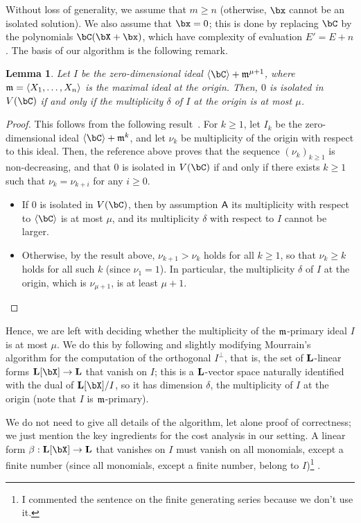 \documentclass[12pt]{article}
\newtheorem{lemma}[definition]{Lemma}
\begin{document}
Without loss of generality, we assume that $m\ge n$ (otherwise, $\bx$
cannot be an isolated solution). We also assume that $\bx=0$; this is
done by replacing $\bC$ by the polynomials $\bC(\bX+\bx)$, which have
complexity of evaluation $E'=E+n$.  The basis of our algorithm is the
following remark.

\begin{lemma}
  Let $I$ be the zero-dimensional ideal
  $\langle \bC \rangle + \m^{\mu+1}$, where
  $\mathfrak{m}=\langle X_1,\dots,X_n\rangle$ is the maximal ideal at the
  origin. Then, $0$ is isolated in $V(\bC)$ if and only if the
  multiplicity $\delta$ of $I$ at the origin is at most $\mu$.
\end{lemma}
\begin{proof}
  This follows from the following
  result~\cite[Theorem~A.1]{BaHaPeSo09}.  For $k \ge 1$, let $I_k$ be
  the zero-dimensional ideal $\langle \bC \rangle + \m^{k}$, and let
  $\nu_k$ be multiplicity of the origin with respect to this
  ideal. Then, the reference above proves that the sequence
  $(\nu_k)_{k \ge 1}$ is non-decreasing, and that $0$ is isolated in
  $V(\bC)$ if and only if there exists $k\ge 1$ such that
  $\nu_k=\nu_{k+i}$ for any $i\geq 0$.
  \begin{itemize}
  \item If $0$ is isolated in $V(\bC)$, then by assumption $\mathsf{A}$ 
    its multiplicity with respect to $\langle \bC\rangle$ is at most $\mu$,
    and its multiplicity $\delta$ with respect to $I$ cannot be larger.
  \item Otherwise, by the result above, $\nu_{k+1} > \nu_k$ holds for
    all $k \ge 1$, so that $\nu_k \ge k$ holds for all such $k$ (since
    $\nu_1=1$). In particular, the multiplicity $\delta$ of 
 $I$ at the origin, which is $\nu_{\mu+1}$, is at least $\mu+1$.
    \qedhere
  \end{itemize}
\end{proof}

Hence, we are left with deciding whether the multiplicity of the
$\mathfrak{m}$-primary ideal $I$ is at most $\mu$. We do this by following and
slightly modifying Mourrain's algorithm for the computation of the
orthogonal $I^{\perp}$, that is, the set of $\mathbf{L}$-linear forms
$\LL[\bX] \to \LL$ that vanish on $I$; this is a $\mathbf{L}$-vector space
naturally identified with the dual of $\LL[\bX]/I$, so it has dimension
$\delta$, the multiplicity of $I$ at the origin (note that $I$ is $\mathfrak{m}$-primary).

We do not need to give all details of the algorithm, let alone proof
of correctness; we just mention the key ingredients for the cost
analysis in our setting. A linear form $\beta: \LL[\bX] \to \LL$ that
vanishes on $I$ must vanish on all monomials, except a finite number
(since all monomials, except a finite number, belong to
$I$)\footnote{I commented the sentence on the finite generating series
  because we don't use it.}%
.
\end{document}
